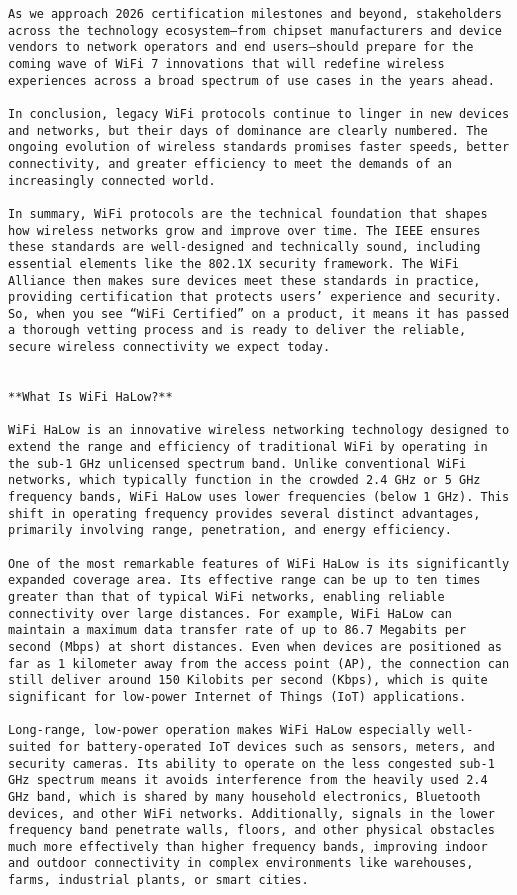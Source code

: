 \begin{verbatim}
As we approach 2026 certification milestones and beyond, stakeholders across the technology ecosystem—from chipset manufacturers and device vendors to network operators and end users—should prepare for the coming wave of WiFi 7 innovations that will redefine wireless experiences across a broad spectrum of use cases in the years ahead.

In conclusion, legacy WiFi protocols continue to linger in new devices and networks, but their days of dominance are clearly numbered. The ongoing evolution of wireless standards promises faster speeds, better connectivity, and greater efficiency to meet the demands of an increasingly connected world.

In summary, WiFi protocols are the technical foundation that shapes how wireless networks grow and improve over time. The IEEE ensures these standards are well-designed and technically sound, including essential elements like the 802.1X security framework. The WiFi Alliance then makes sure devices meet these standards in practice, providing certification that protects users’ experience and security. So, when you see “WiFi Certified” on a product, it means it has passed a thorough vetting process and is ready to deliver the reliable, secure wireless connectivity we expect today.


**What Is WiFi HaLow?**

WiFi HaLow is an innovative wireless networking technology designed to extend the range and efficiency of traditional WiFi by operating in the sub-1 GHz unlicensed spectrum band. Unlike conventional WiFi networks, which typically function in the crowded 2.4 GHz or 5 GHz frequency bands, WiFi HaLow uses lower frequencies (below 1 GHz). This shift in operating frequency provides several distinct advantages, primarily involving range, penetration, and energy efficiency.

One of the most remarkable features of WiFi HaLow is its significantly expanded coverage area. Its effective range can be up to ten times greater than that of typical WiFi networks, enabling reliable connectivity over large distances. For example, WiFi HaLow can maintain a maximum data transfer rate of up to 86.7 Megabits per second (Mbps) at short distances. Even when devices are positioned as far as 1 kilometer away from the access point (AP), the connection can still deliver around 150 Kilobits per second (Kbps), which is quite significant for low-power Internet of Things (IoT) applications.

Long-range, low-power operation makes WiFi HaLow especially well-suited for battery-operated IoT devices such as sensors, meters, and security cameras. Its ability to operate on the less congested sub-1 GHz spectrum means it avoids interference from the heavily used 2.4 GHz band, which is shared by many household electronics, Bluetooth devices, and other WiFi networks. Additionally, signals in the lower frequency band penetrate walls, floors, and other physical obstacles much more effectively than higher frequency bands, improving indoor and outdoor connectivity in complex environments like warehouses, farms, industrial plants, or smart cities.


\end{verbatim}
